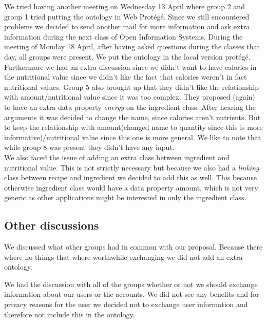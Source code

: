\newline
\newline
\noindent
We tried having another meeting on Wednesday 13 April where group 2 and group 1 tried putting the ontology in Web Protégé. Since we still encountered problems we decided to send another mail for more information and ask extra information during the next class of Open Information Systems. 
\newline
\newline
\noindent
During the meeting of Monday 18 April, after having asked questions during the classes that day, all groups were present. We put the ontology in the local version prot\'eg\'e. Furthermore we had an extra discussion since we didn't want to have calories in the nutritional value since we didn't like the fact that calories weren't in fact nutritional values. Group 5 also brought up that they didn't like the relationship with amount/nutritional value since it was too complex. They proposed (again) to have an extra data property \emph{energy} on the ingredient class. After hearing the arguments it was decided to change the name, since calories aren't nutrients. But to keep the relationship with amount(changed name to quantity since this is more informative)/nutritional value since this one is more general. We like to note that while group 8 was present they didn't have any input.\\
We also faced the issue of adding an extra class between ingredient and nutritional value. This is not strictly necessary but because we also had a \emph{linking} class between recipe and ingredient we decided to add this as well. This because otherwise ingredient class would have a data property amount, which is not very generic as other applications might be interested in only the ingredient class.

\subsection{Other discussions}
We discussed what other groups had in common with our proposal. Because there where no things that where worthwhile exchanging we did not add an extra ontology.

We had the discussion with all of the groups whether or not we should exchange information about our users or the accounts. We did not see any benefits and for privacy reasons for the user we decided not to exchange user information and therefore not include this in the ontology.  
